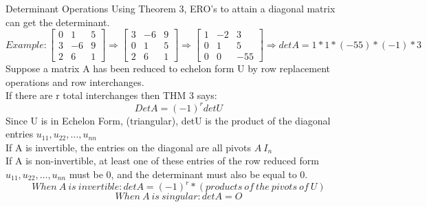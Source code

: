 \documentclass[a4paper, 12pt]{article}
\begin{document}
\begin{subsection}{Determinant Operations}
Using Theorem 3, ERO's to attain a diagonal matrix can get the determinant.
\begin{equation}{Example:}
\begin{bmatrix} 0&1&5 \\ 3&-6&9\\ 2&6&1 \end{bmatrix} \Rightarrow
\begin{bmatrix} 3&-6&9\\ 0&1&5 \\ 2&6&1 \end{bmatrix} \Rightarrow
\begin{bmatrix} 1&-2&3\\ 0&1&5\\ 0&0&-55 \end{bmatrix}\Rightarrow 
detA=1*1*(-55)*(-1)*3
\end{equation}
Suppose a matrix A has been reduced to echelon form U by row replacement 
operations and row interchanges.\\
If there are r total interchanges then THM 3 says:
\begin{equation} DetA=(-1)^{r}detU \end{equation}
Since U is in Echelon Form, (triangular), detU is the product of the
diagonal entries $u_{11},u_{22},\dots,u_{nn}$\\
If A is invertible, the entries on the diagonal are all pivots
$A~I_{n}$\\
If A is non-invertible, at least one of these entries of the row reduced
form $u_{11},u_{22},\dots,u_{nn}$ must be 0, and the determinant must
also be equal to 0.
\begin{equation}{When~A~is~invertible:}
detA=(-1)^{r}*(products~of~the~pivots~of~U) \end{equation}
\begin{equation}{When~A~is~singular:}detA=O\end{equation}
\end{subsection}
\end{document}
